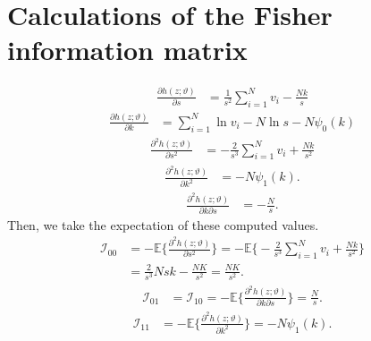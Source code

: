 \documentclass[final]{aomart}
\newtheorem[{}\it]{thm}{Theorem}[section]
\theoremstyle{definition}
\newtheorem*[{}\it]{notation}{Notation}
\numberwithin{equation}{section}
\renewcommand{\theta}{\vartheta}
\newcommand{\fisher}{\mathcal{I}} %
\begin{document}
\section{Calculations of the Fisher information matrix}
\label{fisher_information}
\begin{align}
\frac{\partial h(z;\theta)}{\partial s} & = \frac{1}{s^2}\sum_{i=1}^{N}v_i - \frac{Nk}{s}
\end{align}
\begin{align}
\frac{\partial h(z;\theta)}{\partial k} & = \sum_{i=1}^{N}\ln v_i - N\ln s - N\psi_0(k)
\end{align}
\begin{align}
\frac{\partial^2h(z;\theta)}{\partial s^2} & = -\frac{2}{s^3}\sum_{i=1}^{N}v_i + \frac{Nk}{s^2}
\label{00}
\end{align}
\begin{align}
\frac{\partial^2 h(z; \theta)}{\partial k^2} & = -N\psi_1(k).
\label{11}
\end{align}
\begin{align}
\frac{\partial^2 h(z; \theta)}{\partial k\partial s} & = -\frac{N}{s} .
\end{align}
Then, we take the expectation of these computed values.
\begin{align}
\fisher_{00} & = -\mathbb{E}\bigg\{ \frac{\partial^2 h(z;\theta)}{\partial s^2} \bigg\} = -\mathbb{E}\bigg\{ -\frac{2}{s^3}\sum_{i=1}^{N}v_i + \frac{Nk}{s^2} \bigg\}\\
& = \frac{2}{s^3}Nsk - \frac{NK}{s^2} = \frac{NK}{s^2}.
\end{align}
\begin{align}
\fisher_{01} & = \fisher_{10} =  -\mathbb{E}\bigg\{ \frac{\partial^2 h(z;\theta)}{\partial k \partial s} \bigg\} = \frac{N}{s}.
\end{align}
\begin{align}
\fisher_{11} & = -\mathbb{E}\bigg\{ \frac{\partial^2 h(z;\theta)}{\partial k^2} \bigg\} = -N\psi_1(k).
\end{align}


\end{document}
